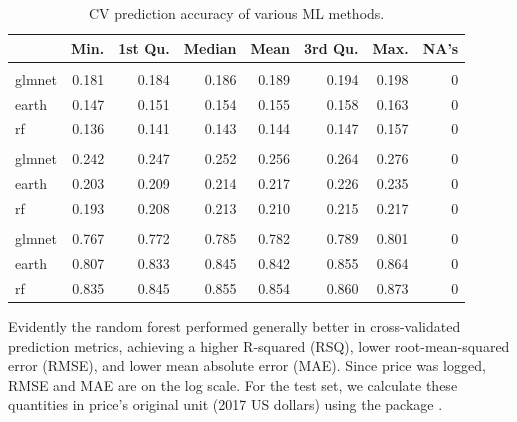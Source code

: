 \begin{Schunk}
\begin{table}

\caption{\label{tab:unnamed-chunk-14}CV prediction accuracy of various ML methods.}
\centering
\begin{tabular}[t]{lrrrrrrr}
\toprule
  & Min. & 1st Qu. & Median & Mean & 3rd Qu. & Max. & NA's\\
\midrule
\addlinespace[0.3em]
\multicolumn{8}{l}{\textbf{MAE}}\\
\hspace{1em}glmnet & 0.181 & 0.184 & 0.186 & 0.189 & 0.194 & 0.198 & 0\\
\hspace{1em}earth & 0.147 & 0.151 & 0.154 & 0.155 & 0.158 & 0.163 & 0\\
\hspace{1em}rf & 0.136 & 0.141 & 0.143 & 0.144 & 0.147 & 0.157 & 0\\
\addlinespace[0.3em]
\multicolumn{8}{l}{\textbf{RMSE}}\\
\hspace{1em}glmnet & 0.242 & 0.247 & 0.252 & 0.256 & 0.264 & 0.276 & 0\\
\hspace{1em}earth & 0.203 & 0.209 & 0.214 & 0.217 & 0.226 & 0.235 & 0\\
\hspace{1em}rf & 0.193 & 0.208 & 0.213 & 0.210 & 0.215 & 0.217 & 0\\
\addlinespace[0.3em]
\multicolumn{8}{l}{\textbf{RSQ}}\\
\hspace{1em}glmnet & 0.767 & 0.772 & 0.785 & 0.782 & 0.789 & 0.801 & 0\\
\hspace{1em}earth & 0.807 & 0.833 & 0.845 & 0.842 & 0.855 & 0.864 & 0\\
\hspace{1em}rf & 0.835 & 0.845 & 0.855 & 0.854 & 0.860 & 0.873 & 0\\
\bottomrule
\end{tabular}
\end{table}

\end{Schunk}

Evidently the random forest performed generally better in
cross-validated prediction metrics, achieving a higher R-squared (RSQ),
lower root-mean-squared error (RMSE), and lower mean absolute error
(MAE). Since price was logged, RMSE and MAE are on the log scale. For
the test set, we calculate these quantities in price's original unit
(2017 US dollars) using the  package
\citep{yardstick}.

